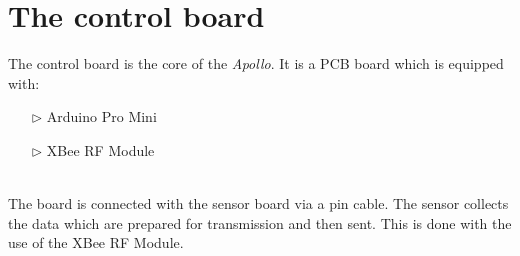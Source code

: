 \documentclass[12pt,a4paper]{report}
\begin{document}
\section{The control board}
The control board is the core of the \emph{Apollo}. It is a PCB board which is equipped with:
\begin{itemize}
\item[$\triangleright$]Arduino Pro Mini
\item[$\triangleright$]XBee RF Module
\end{itemize}
% 
\ \\
%
The board is connected with the sensor board via a pin cable. 
The sensor collects the data which are prepared for transmission and then sent.
This is done with the use of the XBee RF Module.\\
%
\end{document}

